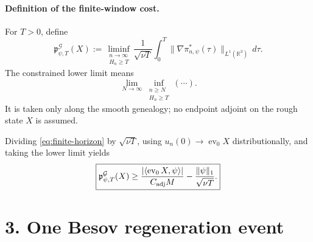 \documentclass[11pt]{article}
\newcommand{\R}{\mathbb R}
\newcommand{\cG}{\mathcal G}
\newcommand{\ev}{\operatorname{ev}}
\begin{document}
\paragraph{Definition of the finite-window cost.}
For \(T>0\), define
\begin{equation}
  \boxed{
  \mathfrak p^\cG_{\psi,T}(X)
  :=
  \liminf_{\substack{n\to\infty\\H_n\ge T}}
  \frac{1}{\sqrt{\nu T}}
  \int_0^T
  \|\nabla\pi^*_{n,\psi}(\tau)\|_{L^1(\R^3)}\,d\tau .}
  \label{eq:cost}
\end{equation}
The constrained lower limit means
\[
  \lim_{N\to\infty}
  \inf_{\substack{n\ge N\\H_n\ge T}}(\cdots).
\]
It is taken only along the smooth genealogy; no endpoint adjoint on the
rough state \(X\) is assumed.

Dividing \eqref{eq:finite-horizon} by \(\sqrt{\nu T}\), using
\(u_n(0)\to\ev_0X\) distributionally, and taking the lower limit yields
\begin{equation}
  \boxed{
  \mathfrak p^\cG_{\psi,T}(X)
  \ge
  \frac{|\langle\ev_0X,\psi\rangle|}
       {C_{\rm adj}M}
  -\frac{\|\psi\|_1}{\sqrt{\nu T}} .}
  \label{eq:cost-lower}
\end{equation}

\section*{3. One Besov regeneration event}
\end{document}
